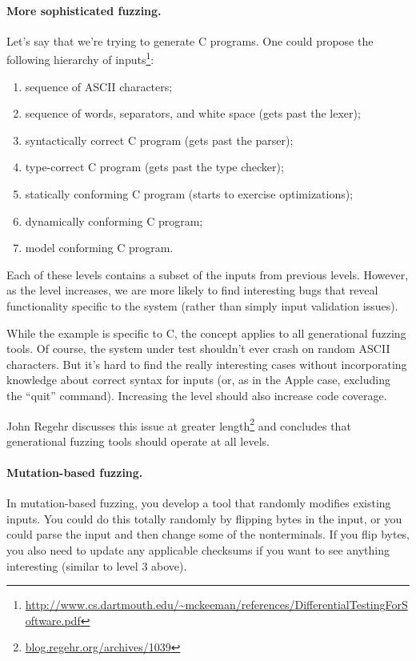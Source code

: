 \documentclass[11pt]{article}
\begin{document}
\paragraph{More sophisticated fuzzing.} Let's say that we're trying to
generate C programs. One could propose the following hierarchy of inputs\footnote{\url{http://www.cs.dartmouth.edu/~mckeeman/references/DifferentialTestingForSoftware.pdf}}:
\begin{enumerate}
\item sequence of ASCII characters;
\item sequence of words, separators, and white space (gets past the lexer);
\item syntactically correct C program (gets past the parser);
\item type-correct C program (gets past the type checker);
\item statically conforming C program (starts to exercise optimizations);
\item dynamically conforming C program;
\item model conforming C program.
\end{enumerate}
Each of these levels contains a subset of the inputs from
previous levels. However, as the level increases, we are more likely
to find interesting bugs that reveal functionality specific
to the system (rather than simply input validation issues).

While the example is specific to C, the concept applies to all
generational fuzzing tools. Of course, the system under test
shouldn't ever crash on random ASCII characters. But it's hard
to find the really interesting cases without incorporating knowledge
about correct syntax for inputs (or, as in the Apple case, excluding
the ``quit'' command). Increasing the level should also increase
code coverage.

John Regehr discusses this issue at greater
length\footnote{\url{blog.regehr.org/archives/1039}} and concludes
that generational fuzzing tools should operate at all levels.

\paragraph{Mutation-based fuzzing.}
In mutation-based fuzzing, you develop a tool that randomly modifies existing
inputs. You could do this totally randomly by flipping bytes in the input,
or you could parse the input and then change some of the nonterminals.
If you flip bytes, you also need to update any applicable
checksums if you want to see anything interesting (similar to
level 3 above).
\end{document}
